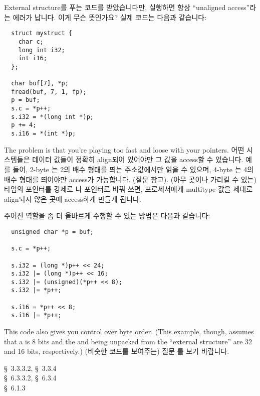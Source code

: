 \begin{faq}
	External structure를 푸는 코드를 받았습니다만, 실행하면 항상
        ``unaligned access''라는 에러가 납니다. 이게 무슨 뜻인가요?
        실제 코드는 다음과 같습니다:
\begin{verbatim}
  struct mystruct {
    char c;
    long int i32;
    int i16;
  };

  char buf[7], *p;
  fread(buf, 7, 1, fp);
  p = buf;
  s.c = *p++;
  s.i32 = *(long int *)p;
  p += 4;
  s.i16 = *(int *)p;
\end{verbatim}
\A
	The problem is that you're playing too fast and loose with your
        pointers. 어떤 시스템들은 데이터 값들이 정확히 align되어 있어야만 그 값을
        access할 수 있습니다. 예를 들어, 2-byte 는 2의 배수 형태를
        띄는 주소값에서만 읽을 수 있으며, 4-byte 는 4의 배수 형태를
        띄어야만 access가 가능합니다. (질문  참고). 
        (아무 곳이나 가리킬 수 있는)  타입의 포인터를 강제로 나
         포인터로 바꿔 쓰면, 프로세서에게 multitype 값을 
        제대로 align되지 않은 곳에 access하게 만들게 됩니다.

        주어진 역할을 좀 더 올바르게 수행할 수 있는 방법은 다음과 같습니다:
\begin{verbatim}
  unsigned char *p = buf;

  s.c = *p++;

  s.i32 = (long *)p++ << 24;
  s.i32 |= (long *)p++ << 16;
  s.i32 |= (unsigned)(*p++ << 8);
  s.i32 |= *p++;

  s.i16 = *p++ << 8;
  s.i16 |= *p++;
\end{verbatim}
	\noindent This code also gives you control over byte order.
        (This example, though, assumes that a  is 8 bits and the
         and  being unpacked from the ``external
        structure'' are 32 and 16 bits, respectively.)
        (비슷한 코드를 보여주는) 질문 를 보기 바랍니다. 

\R
	\cite{ansi} \S\ 3.3.3.2, \S\ 3.3.4 \\
        \cite{c89} \S\ 6.3.3.2, \S\ 6.3.4 \\
        \cite{hs} \S\ 6.1.3 
\end{faq}

